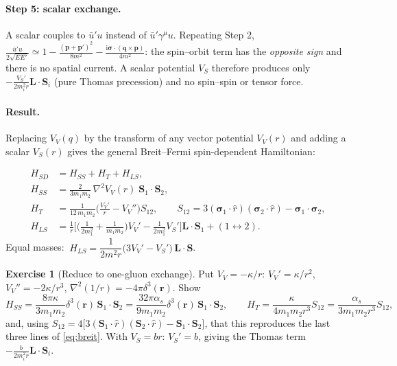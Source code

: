 \documentclass[11pt,a4paper]{article}
\numberwithin{equation}{section}
\theoremstyle{definition}
\newtheorem{exercise}[definition]{Exercise}
\theoremstyle{plain}
\theoremstyle{remark}
\newenvironment{keyresult}[1][Key result]{\begin{tcolorbox}[keybox,title={\small\bfseries #1},fonttitle=\small,coltitle=white,colbacktitle=MidnightBlue!70]}{\end{tcolorbox}}
\numberwithin{algorithm}{section}
\newcommand{\vr}{\bm r}
\newcommand{\vp}{\bm p}
\newcommand{\vq}{\bm q}
\newcommand{\vL}{\bm L}
\newcommand{\vS}{\bm S}
\newcommand{\vsig}{\bm\sigma}
\newcommand{\as}{\alpha_s}
\newcommand{\ii}{\mathrm{i}}
\begin{document}
\paragraph{Step 5: scalar exchange.} A scalar couples to $\bar u'u$ instead of $\bar u'\gamma^\mu u$. Repeating Step 2, $\frac{\bar u'u}{2\sqrt{EE'}}\simeq1-\frac{(\vp+\vp')^2}{8m^2}-\frac{\ii\vsig\cdot(\vq\times\vp)}{4m^2}$: the spin--orbit term has the \emph{opposite sign} and there is no spatial current. A scalar potential $V_S$ therefore produces only $-\frac{V_S'}{2m_i^2r}\vL\cdot\vS_i$ (pure Thomas precession) and no spin--spin or tensor force.

\paragraph{Result.} Replacing $V_V(q)$ by the transform of any vector potential $V_V(r)$ and adding a scalar $V_S(r)$ gives the general Breit--Fermi spin-dependent Hamiltonian:


\begin{keyresult}[Breit--Fermi spin-dependent Hamiltonian]
\begin{align}
H_{SD}&=H_{SS}+H_T+H_{LS},\label{eq:HSD}\\
H_{SS}&=\frac{2}{3m_1m_2}\,\nabla^2V_V(r)\;\vS_1\!\cdot\!\vS_2,\label{eq:HSS}\\
H_T&=\frac{1}{12\,m_1m_2}\Big(\frac{V_V'}{r}-V_V''\Big)S_{12},\qquad S_{12}=3(\vsig_1\!\cdot\!\hat r)(\vsig_2\!\cdot\!\hat r)-\vsig_1\!\cdot\!\vsig_2,\label{eq:HT}\\
H_{LS}&=\frac1r\Big[\Big(\frac1{2m_1^2}+\frac1{m_1m_2}\Big)V_V'-\frac1{2m_1^2}V_S'\Big]\vL\!\cdot\!\vS_1+(1\leftrightarrow2).\label{eq:HLS}
\end{align}
Equal masses: $\ H_{LS}=\dfrac{1}{2m^2r}\big(3V_V'-V_S'\big)\,\vL\!\cdot\!\vS$.
\end{keyresult}

\begin{exercise}[Reduce to one-gluon exchange]
Put $V_V=-\kappa/r$: $V_V'=\kappa/r^2$, $V_V''=-2\kappa/r^3$, $\nabla^2(1/r)=-4\pi\delta^3(\vr)$. Show
\begin{equation}
H_{SS}=\frac{8\pi\kappa}{3m_1m_2}\delta^3(\vr)\,\vS_1\!\cdot\!\vS_2=\frac{32\pi\as}{9m_1m_2}\delta^3(\vr)\,\vS_1\!\cdot\!\vS_2,\qquad
H_T=\frac{\kappa}{4m_1m_2r^3}S_{12}=\frac{\as}{3m_1m_2r^3}S_{12},
\end{equation}
and, using $S_{12}=4\big[3(\vS_1\!\cdot\!\hat r)(\vS_2\!\cdot\!\hat r)-\vS_1\!\cdot\!\vS_2\big]$, that this reproduces the last three lines of \eqref{eq:breit}. With $V_S=br$: $V_S'=b$, giving the Thomas term $-\frac{b}{2m_i^2r}\vL\!\cdot\!\vS_i$.
\end{exercise}
\end{document}
